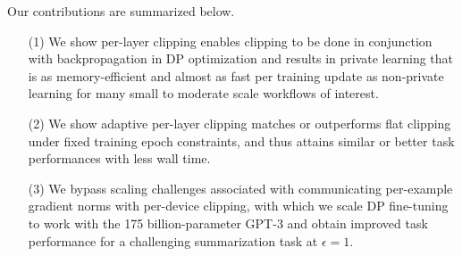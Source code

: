 Our contributions are summarized below. 
\begin{itemize}[leftmargin=6mm]
\item[(1)] We show per-layer clipping enables clipping to be done in conjunction with backpropagation in DP optimization and results in private learning that is as memory-efficient and almost as fast per training update as non-private learning for many small to moderate scale workflows of interest.
\item[(2)] We show adaptive per-layer clipping matches or outperforms flat clipping under fixed training epoch constraints, and thus attains similar or better task performances with less wall time.
\item[(3)] We bypass scaling challenges associated with communicating per-example gradient norms with per-device clipping, with which we scale DP fine-tuning to work with the 175 billion-parameter GPT-3 and obtain improved task performance for a challenging summarization task at $\epsilon=1$.
\end{itemize}

